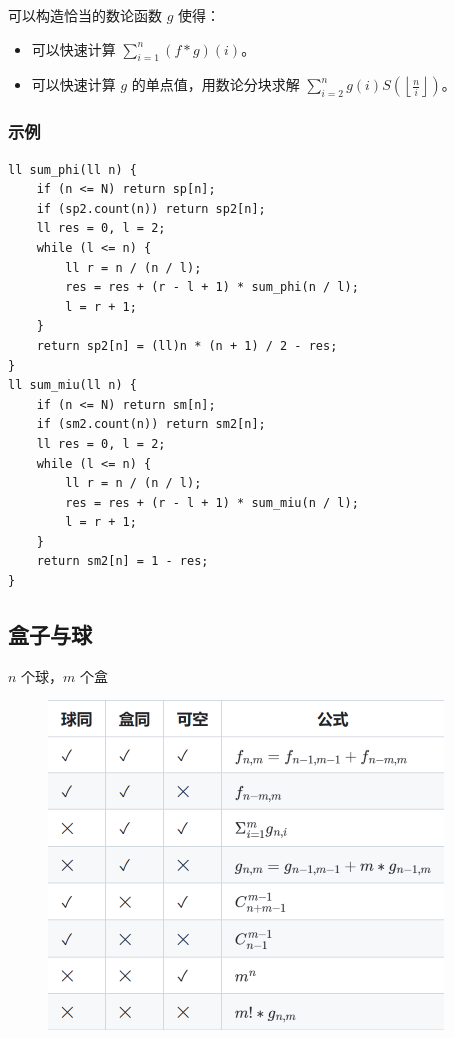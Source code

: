 \documentclass[UTF8]{ctexart}
\begin{document}
\begin{sloppypar}
可以构造恰当的数论函数 $g$ 使得：

\begin{itemize}
   \item 可以快速计算 $\sum_{i=1}^n(f * g)(i)$。
   \item 可以快速计算 $g$ 的单点值，用数论分块求解 $\sum_{i=2}^ng(i)S\left(\left\lfloor\frac{n}{i}\right\rfloor\right)$。
\end{itemize}

\subsubsection{示例}

\begin{lstlisting}[style=cpp]
ll sum_phi(ll n) {
    if (n <= N) return sp[n];
    if (sp2.count(n)) return sp2[n];
    ll res = 0, l = 2;
    while (l <= n) {
        ll r = n / (n / l);
        res = res + (r - l + 1) * sum_phi(n / l);
        l = r + 1;
    }
    return sp2[n] = (ll)n * (n + 1) / 2 - res;
}
ll sum_miu(ll n) {
    if (n <= N) return sm[n];
    if (sm2.count(n)) return sm2[n];
    ll res = 0, l = 2;
    while (l <= n) {
        ll r = n / (n / l);
        res = res + (r - l + 1) * sum_miu(n / l);
        l = r + 1;
    }
    return sm2[n] = 1 - res;
}
\end{lstlisting}

\subsection{盒子与球}

$n$ 个球，$m$ 个盒

\begin{figure}[H]
    \flushleft
    \includegraphics[]{box-and-ball.png}
    \label{fig:left}
\end{figure}


\end{sloppypar}
\end{document}
